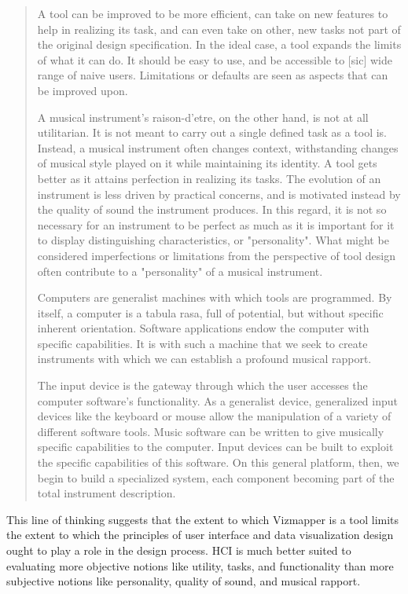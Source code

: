\begin{quote}
A tool can be improved to be more efficient, can take on new features to help in realizing its task, and can even take on other, new tasks not part of the original design specification. In the ideal case, a tool expands the limits of what it can do. It should be easy to use, and be accessible to [sic] wide range of naive users. Limitations or defaults are seen as aspects that can be improved upon.

A musical instrument's raison-d'etre, on the other hand, is not at all utilitarian. It is not meant to carry out a single defined task as a tool is. Instead, a musical instrument often changes context, withstanding changes of musical style played on it while maintaining its identity. A tool gets better as it attains perfection in realizing its tasks. The evolution of an instrument is less driven by practical concerns, and is motivated instead by the quality of sound the instrument produces. In this regard, it is not so necessary for an instrument to be perfect as much as it is important for it to display distinguishing characteristics, or "personality". What might be considered imperfections or limitations from the perspective of tool design often contribute to a "personality" of a musical instrument.

Computers are generalist machines with which tools are programmed. By itself, a computer is a tabula rasa, full of potential, but without specific inherent orientation. Software applications endow the computer with specific capabilities. It is with such a machine that we seek to create instruments with which we can establish a profound musical rapport.

The input device is the gateway through which the user accesses the computer software's functionality. As a generalist device, generalized input devices like the keyboard or mouse allow the manipulation of a variety of different software tools. Music software can be written to give musically specific capabilities to the computer. Input devices can be built to exploit the specific capabilities of this software. On this general platform, then, we begin to build a specialized system, each component becoming part of the total instrument description. 
\end{quote}

This line of thinking suggests that the extent to which Vizmapper is a tool limits the extent to which the principles of user interface and data visualization design ought to play a role in the design process. HCI is much better suited to evaluating more objective notions like utility, tasks, and functionality than more subjective notions like personality, quality of sound, and musical rapport.

